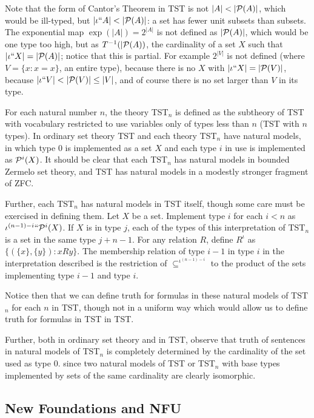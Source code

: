 \documentclass[112pt]{article}
\begin{document}
Note that the form of Cantor's Theorem in TST is not $|A| < |{\cal P}(A)|$, which would be ill-typed, but $|\iota``A|<|{\cal P}(A)|$:  a set has fewer unit subsets than subsets.  The exponential map $\exp(|A|) = 2^{|A|}$ is not defined as $|{\cal P}(A)|$, which would be one type too high, but as $T^{-1}(|{\cal P}(A))$, the cardinality of a set $X$ such that $|\iota``X| = |{\cal P}(A)|$;   notice that this is partial.  For example
$2^{|V|}$ is not defined (where $V=\{x:x=x\}$, an entire type), because there is no $X$ with $|\iota``X|=|{\cal P}(V)|$, because $|\iota``V|<|{\cal P}(V)| \leq |V|$, and of course there is no set larger than $V$ in its type.

For each natural number $n$, the theory TST$_n$ is defined as the subtheory of TST with vocabulary restricted to use variables only of types less than $n$ (TST with $n$ types).
In ordinary set theory TST and each theory TST$_n$ have natural models, in which type 0 is implemented as a set $X$ and each type $i$ in use is implemented as ${\cal P}^i(X)$.  It should be clear that each TST$_n$ has natural models in bounded Zermelo set theory, and TST has natural models in a modestly stronger fragment of ZFC.

Further, each TST$_n$ has natural models in TST itself, though some care must be exercised in defining them.  Let $X$ be a set.  Implement type $i$ for each $i<n$ as
$\iota^{(n-1)-i}``{\cal P}^i(X)$.  If $X$ is in type $j$, each of the types of this interpretation of TST$_n$ is a set in the same type $j+n-1$.  For any relation $R$, define
$R^{\iota}$ as $\{(\{x\},\{y\}):x R y\}$.  The membership relation of type $i-1$ in type $i$ in the interpretation described is the restriction of $\subseteq^{\iota^{(n-1)-i}}$ to
the product of the sets implementing type $i-1$ and type $i$.

Notice then that we can define truth for formulas in these natural models of TST$_n$ for each $n$ in TST, though not in a uniform way which would allow us to define truth for formulas
in TST in TST.

Further, both in ordinary set theory and in TST, observe that truth of sentences in natural models of TST$_n$ is completely determined by the cardinality of the set used as type 0.
since two natural models of TST or TST$_n$ with base types implemented by sets of the same cardinality are clearly isomorphic. 

\newpage

\subsection{New Foundations and NFU}
\end{document}
